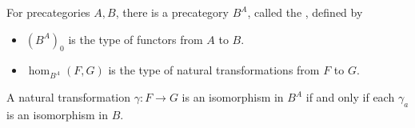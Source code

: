 \documentclass[hott-all.tex]{subfiles}
\begin{document}
\begin{defn}
  For precategories $A,B$, there is a precategory $B^A$, called the , defined by
  \begin{itemize}
  \item $(B^A)_0$ is the type of functors from $A$ to $B$.
  \item $\hom_{B^A}(F,G)$ is the type of natural transformations from $F$ to $G$.
  \end{itemize}
\end{defn}

\begin{lem}
  A natural transformation $\gamma:F\to G$ is an isomorphism in $B^A$ if and only if each $\gamma_a$ is an isomorphism in $B$.
\end{lem}
%

\end{document}
